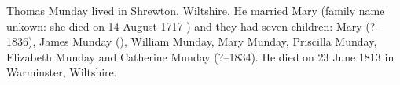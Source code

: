 
Thomas Munday lived in Shrewton, Wiltshire.  He married Mary (family name unkown: she died on 14 August 1717 \cite{ThomasMundayDeath}) and they had seven children: Mary (?--1836), James Munday (), William Munday, Mary Munday, Priscilla Munday, Elizabeth Munday and Catherine Munday (?--1834). He died on 23 June 1813 in Warminster, Wiltshire.\cite{ThomasMundayDeath}
